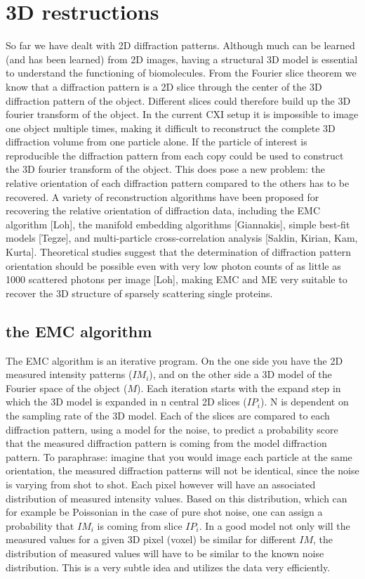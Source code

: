 \chapter{3D restructions}
So far we have dealt with 2D diffraction patterns. Although much can be learned (and has been learned) from 2D images, having a structural 3D model is essential to understand the functioning of biomolecules. From the Fourier slice theorem we know that a diffraction pattern is a 2D slice through the center of the 3D diffraction pattern of the object. Different slices could therefore build up the 3D fourier transform of the object. In the current CXI setup it is impossible to image one object multiple times, making it difficult to reconstruct the complete 3D diffraction volume from one particle alone. If the particle of interest is reproducible the diffraction pattern from each copy could be used to construct the 3D fourier transform of the object. This does pose a new problem: the relative orientation of each diffraction pattern compared to the others has to be recovered. A variety of reconstruction algorithms have been proposed for recovering the relative orientation of diffraction data, including the EMC algorithm [Loh], the manifold embedding algorithms [Giannakis], simple best-fit models [Tegze], and multi-particle cross-correlation analysis [Saldin, Kirian, Kam, Kurta]. Theoretical studies suggest that the determination of diffraction pattern orientation should be possible even with very low photon counts of as little as 1000 scattered photons per image [Loh], making EMC and ME very suitable to recover the 3D structure of sparsely scattering single proteins.

\section{the EMC algorithm}
The EMC algorithm is an iterative program. On the one side you have the 2D measured intensity patterns ($IM_i$), and on the other side a 3D model of the Fourier space of the object ($M$). Each iteration starts with the expand step in which the 3D model is expanded in n central 2D slices ($IP_i$). N is dependent on the sampling rate of the 3D model. Each of the slices are compared to each diffraction pattern, using a model for the noise, to predict a probability score that the measured diffraction pattern is coming from the model diffraction pattern. To paraphrase: imagine that you would image each particle at the same orientation, the measured diffraction patterns will not be identical, since the noise is varying from shot to shot. Each pixel however will have an associated distribution of measured intensity values. Based on this distribution, which can for example be Poissonian in the case of pure shot noise, one can assign a probability that $IM_i$ is coming from slice $IP_i$. In  a good model not only will the measured values for a given 3D pixel (voxel) be similar for different $IM$, the distribution of measured values will have to be similar to the known noise distribution. This is a very subtle idea and utilizes the data very efficiently.

